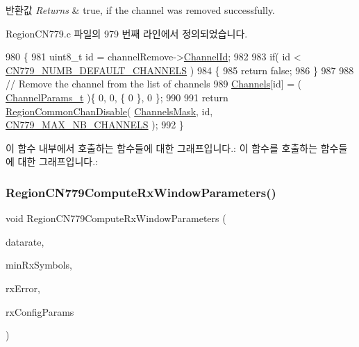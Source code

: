 \begin{DoxyRetVals}{반환값}
{\em Returns} & true, if the channel was removed successfully. \\
\hline
\end{DoxyRetVals}


Region\+C\+N779.\+c 파일의 979 번째 라인에서 정의되었습니다.


\begin{DoxyCode}
980 \{
981     uint8\_t \textcolor{keywordtype}{id} = channelRemove->\mbox{\hyperlink{structs_channel_remove_params_ae23f953dc29c360e56a3c856404a3276}{ChannelId}};
982 
983     \textcolor{keywordflow}{if}( \textcolor{keywordtype}{id} < \mbox{\hyperlink{group___r_e_g_i_o_n_c_n779_ga03a2c79e3c0f039e5f1150e4d9fdfa1a}{CN779\_NUMB\_DEFAULT\_CHANNELS}} )
984     \{
985         \textcolor{keywordflow}{return} \textcolor{keyword}{false};
986     \}
987 
988     \textcolor{comment}{// Remove the channel from the list of channels}
989     \mbox{\hyperlink{_region_c_n779_8c_ad43b16563c3a87159ec34d1db860a3da}{Channels}}[id] = ( \mbox{\hyperlink{group___l_o_r_a_m_a_c_ga1360ca6f82c6d125ea43a9dad9b56184}{ChannelParams\_t}} )\{ 0, 0, \{ 0 \}, 0 \};
990 
991     \textcolor{keywordflow}{return} \mbox{\hyperlink{group___r_e_g_i_o_n_c_o_m_m_o_n_ga695c0ab2a06edcae5b33772f639fb676}{RegionCommonChanDisable}}( \mbox{\hyperlink{_region_c_n779_8c_a2188957b5ca6af8092154d7ccbfa5757}{ChannelsMask}}, \textcolor{keywordtype}{id}, 
      \mbox{\hyperlink{group___r_e_g_i_o_n_c_n779_gaa23230e648a8147840e88f03f9d3b7fc}{CN779\_MAX\_NB\_CHANNELS}} );
992 \}
\end{DoxyCode}
이 함수 내부에서 호출하는 함수들에 대한 그래프입니다.\+:
이 함수를 호출하는 함수들에 대한 그래프입니다.\+:
\mbox{\label{group___r_e_g_i_o_n_c_n779_ga4f354a88e5bfee44eccaad7d2e18c87e}} 
\subsubsection{\texorpdfstring{Region\+C\+N779\+Compute\+Rx\+Window\+Parameters()}{RegionCN779ComputeRxWindowParameters()}}
{\footnotesize\ttfamily void Region\+C\+N779\+Compute\+Rx\+Window\+Parameters (\begin{DoxyParamCaption}\item[{int8\+\_\+t}]{datarate,  }\item[{uint8\+\_\+t}]{min\+Rx\+Symbols,  }\item[{uint32\+\_\+t}]{rx\+Error,  }\item[{\mbox{\hyperlink{group___r_e_g_i_o_n_ga375c038078dfcfc7ef14280021db719e}{Rx\+Config\+Params\+\_\+t}} $\ast$}]{rx\+Config\+Params }\end{DoxyParamCaption})}

